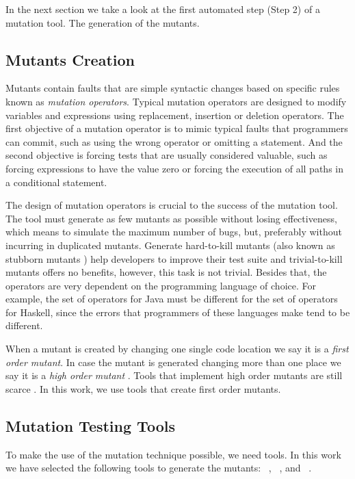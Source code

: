 In the next section we take a look at the first automated step (Step 2) of a mutation tool. 
The generation of the mutants.

\subsection{Mutants Creation}
Mutants contain faults that are simple syntactic changes based on specific rules known as \textit{mutation operators}. 
Typical mutation operators are designed to modify variables and expressions using replacement, insertion or deletion operators. 
The first objective of a mutation operator is to mimic typical faults that programmers can commit, such as using the wrong operator or omitting a statement.
And the second objective is forcing tests that are usually considered valuable, such as forcing expressions to have the value zero or forcing the execution of all paths in a conditional statement.

The design of mutation operators is crucial to the success of the mutation tool.
The tool must generate as few mutants as possible without losing effectiveness, which means to simulate the maximum number of bugs, but, preferably without incurring in duplicated mutants.
Generate hard-to-kill mutants (also known as stubborn mutants \cite{YAO:2014:1}) help developers to improve their test suite and trivial-to-kill mutants offers no benefits, however, this task is not trivial. 
Besides that, the operators are very dependent on the programming language of choice. For example, the set of operators for Java must be different for the set of operators for Haskell, since the errors that programmers of these languages make tend to be different. 

When a mutant is created by changing one single code location we say it is a \textit{first order mutant}. 
In case the mutant is generated changing more than one place we say it is a \textit{high order mutant} \cite{JIA:2008:1}. 
Tools that implement high order mutants are still scarce \cite{MADEYISKI:2014:1}. 
In this work, we use tools that create first order mutants.

\subsection{Mutation Testing Tools}
To make the use of the mutation technique possible, we need tools.
In this work we have selected the following tools to generate the mutants:
\mujava{}~\cite{OFFUTT:2005:1, OFFUT:2006:1}, \major{}~\cite{JUST:2011:1}, and \pit{}~\cite{PIT:2017}.

